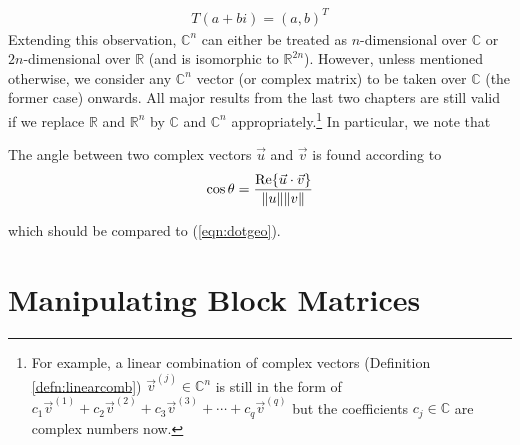 \begin{align*}
T(a+bi) = (a,b)^T
\end{align*}
Extending this observation, $\mathbb{C}^n$ can either be treated as $n$-dimensional over $\mathbb{C}$ or $2n$-dimensional over $\mathbb{R}$ (and is isomorphic to $\mathbb{R}^{2n}$). However, unless mentioned otherwise, we consider any $\mathbb{C}^n$ vector (or complex matrix) to be taken over $\mathbb{C}$ (the former case) onwards. All major results from the last two chapters are still valid if we replace $\mathbb{R}$ and $\mathbb{R}^n$ by $\mathbb{C}$ and $\mathbb{C}^n$ appropriately.\footnote{For example, a linear combination of complex vectors (Definition \ref{defn:linearcomb}) $\vec{v}^{(j)} \in \mathbb{C}^n$ is still in the form of $c_1\vec{v}^{(1)} + c_2\vec{v}^{(2)} + c_3\vec{v}^{(3)} + \cdots + c_q\vec{v}^{(q)}$ but the coefficients $c_j \in \mathbb{C}$ are complex numbers now.} In particular, we note that
\begin{proper}
The angle between two complex vectors $\vec{u}$ and $\vec{v}$ is found according to
\begin{align}
\cos \theta = \frac{\Re{\vec{u} \cdot \vec{v}}}{\norm{u}\norm{v}}
\end{align}
\end{proper}
which should be compared to (\ref{eqn:dotgeo}).

\section{Manipulating Block Matrices}

